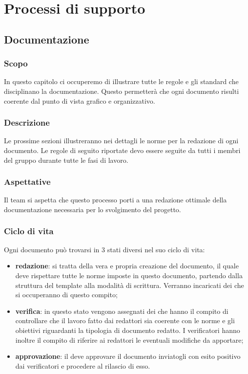 \section{Processi di supporto}

\subsection{Documentazione} \label{_processoDiDocumentazione}

\subsubsection{Scopo}
In questo capitolo ci occuperemo di illustrare tutte le regole e gli standard che disciplinano la documentazione. Questo permetterà che ogni documento risulti coerente dal punto di vista grafico e organizzativo.

\subsubsection{Descrizione}
Le prossime sezioni illustreranno nei dettagli le norme per la redazione di ogni documento.
Le regole di seguito riportate devo essere seguite da tutti i membri del gruppo durante tutte le fasi di lavoro.

\subsubsection{Aspettative}
Il team si aspetta che questo processo porti a una redazione ottimale della documentazione necessaria per lo svolgimento del progetto.

\subsubsection{Ciclo di vita}
Ogni documento può trovarsi in 3 stati diversi nel suo ciclo di vita:
\begin{itemize}
    \item\textbf{redazione}: si tratta della vera e propria creazione del documento, il quale deve rispettare tutte le norme imposte in questo documento, partendo dalla struttura del template alla modalità di scrittura. Verranno incaricati dei  che si occuperanno di questo compito;
    \item\textbf{verifica}: in questo stato vengono assegnati dei  che hanno il compito di controllare che il lavoro fatto dai redattori sia coerente con le norme e gli obiettivi riguardanti la tipologia di documento redatto. I verificatori hanno inoltre il compito di riferire ai redattori le eventuali modifiche da apportare;
    \item\textbf{approvazione}: il  deve approvare il documento inviatogli con esito positivo dai verificatori e procedere al rilascio di esso.
\end{itemize}

